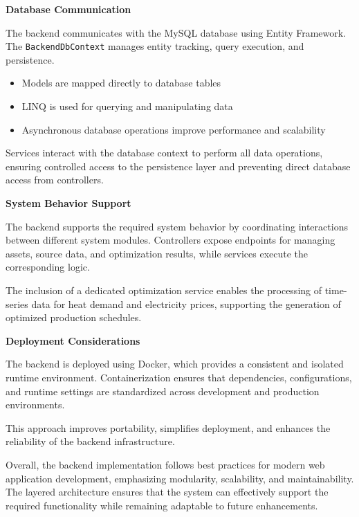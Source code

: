 \textbf{Database Communication}

\hspace*{1cm}The backend communicates with the MySQL database using Entity Framework. The \texttt{BackendDbContext} manages entity tracking, query execution, and persistence.

\begin{itemize}
    \item Models are mapped directly to database tables
    \item LINQ is used for querying and manipulating data
    \item Asynchronous database operations improve performance and scalability
\end{itemize}

\hspace*{1cm}Services interact with the database context to perform all data operations, ensuring controlled access to the persistence layer and preventing direct database access from controllers.


\textbf{System Behavior Support}

\hspace*{1cm}The backend supports the required system behavior by coordinating interactions between different system modules. Controllers expose endpoints for managing assets, source data, and optimization results, while services execute the corresponding logic.

\hspace*{1cm}The inclusion of a dedicated optimization service enables the processing of time-series data for heat demand and electricity prices, supporting the generation of optimized production schedules.


\textbf{Deployment Considerations}

\hspace*{1cm}The backend is deployed using Docker, which provides a consistent and isolated runtime environment. Containerization ensures that dependencies, configurations, and runtime settings are standardized across development and production environments.

\hspace*{1cm}This approach improves portability, simplifies deployment, and enhances the reliability of the backend infrastructure.

\hspace*{1cm}Overall, the backend implementation follows best practices for modern web application development, emphasizing modularity, scalability, and maintainability. The layered architecture ensures that the system can effectively support the required functionality while remaining adaptable to future enhancements.

